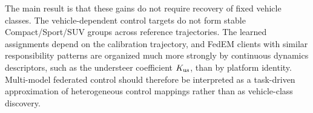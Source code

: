 The main result is that these gains do not require recovery of fixed vehicle classes.
The vehicle-dependent control targets do not form stable Compact/Sport/SUV groups across reference trajectories.
The learned assignments depend on the calibration trajectory, and FedEM clients with similar responsibility patterns are organized much more strongly by continuous dynamics descriptors, such as the understeer coefficient $K_{\rm us}$, than by platform identity.
Multi-model federated control should therefore be interpreted as a task-driven approximation of heterogeneous control mappings rather than as vehicle-class discovery.





